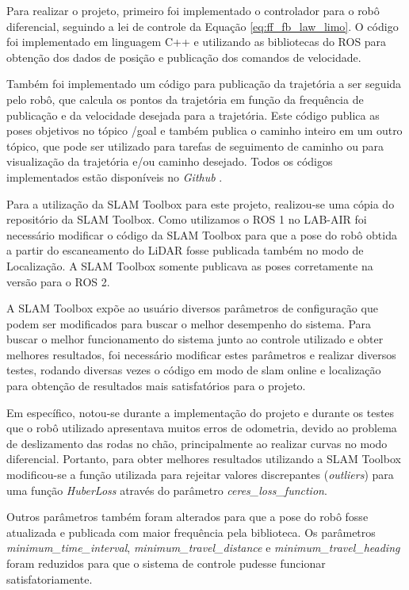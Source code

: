     Para realizar o projeto, primeiro foi implementado o controlador para o robô diferencial, seguindo a lei de controle da Equação \ref{eq:ff_fb_law_limo}. O código foi implementado em linguagem C++ e utilizando as bibliotecas do ROS para obtenção dos dados de posição e publicação dos comandos de velocidade.
    
    Também foi implementado um código para publicação da trajetória a ser seguida pelo robô, que calcula os pontos da trajetória em função da frequência de publicação e da velocidade desejada para a trajetória. Este código publica as poses objetivos no tópico /goal e também publica o caminho inteiro em um outro tópico, que pode ser utilizado para tarefas de seguimento de caminho ou para visualização da trajetória e/ou caminho desejado. Todos os códigos implementados estão disponíveis no \textit{Github} \cite{site:Github-SLAM_Research}.

    Para a utilização da SLAM Toolbox para este projeto, realizou-se uma cópia do repositório da SLAM Toolbox\cite{site:Slam_toolbox}. Como utilizamos o ROS 1 no LAB-AIR foi necessário modificar o código da SLAM Toolbox para que a pose do robô obtida a partir do escaneamento do LiDAR fosse publicada também no modo de Localização. A SLAM Toolbox somente publicava as poses corretamente na versão para o ROS 2.

    A SLAM Toolbox expõe ao usuário diversos parâmetros de configuração que podem ser modificados para buscar o melhor desempenho do sistema. Para buscar o melhor funcionamento do sistema junto ao controle utilizado e obter melhores resultados, foi necessário modificar estes parâmetros e realizar diversos testes, rodando diversas vezes o código em modo de slam online e localização para obtenção de resultados mais satisfatórios para o projeto.
    
    Em específico, notou-se durante a implementação do projeto e durante os testes que o robô utilizado apresentava muitos erros de odometria, devido ao problema de deslizamento das rodas no chão, principalmente ao realizar curvas no modo diferencial. Portanto, para obter melhores resultados utilizando a SLAM Toolbox modificou-se a função utilizada para rejeitar valores discrepantes (\textit{outliers}) para uma função \textit{HuberLoss} através do parâmetro \textit{ceres\_loss\_function}.

    Outros parâmetros também foram alterados para que a pose do robô fosse atualizada e publicada com maior frequência pela biblioteca. Os parâmetros \textit{minimum\_time\_interval}, \textit{minimum\_travel\_distance} e \textit{minimum\_travel\_heading} foram reduzidos para que o sistema de controle pudesse funcionar satisfatoriamente.
    

